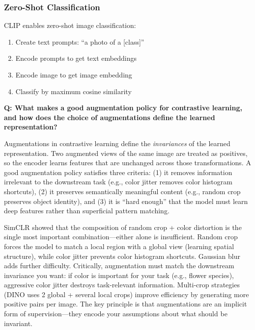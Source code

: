 \subsubsection{Zero-Shot Classification}

CLIP enables zero-shot image classification:
\begin{enumerate}
    \item Create text prompts: ``a photo of a [class]''
    \item Encode prompts to get text embeddings
    \item Encode image to get image embedding
    \item Classify by maximum cosine similarity
\end{enumerate}

\begin{interviewq}
\textbf{Q: What makes a good augmentation policy for contrastive learning, and how does the choice of augmentations define the learned representation?}

 \quad {} \quad \badgefreq{\freqmed}

\stronganswer Augmentations in contrastive learning define the \textit{invariances} of the learned representation. Two augmented views of the same image are treated as positives, so the encoder learns features that are unchanged across those transformations. A good augmentation policy satisfies three criteria: (1) it removes information irrelevant to the downstream task (e.g., color jitter removes color histogram shortcuts), (2) it preserves semantically meaningful content (e.g., random crop preserves object identity), and (3) it is ``hard enough'' that the model must learn deep features rather than superficial pattern matching.

SimCLR showed that the composition of random crop + color distortion is the single most important combination---either alone is insufficient. Random crop forces the model to match a local region with a global view (learning spatial structure), while color jitter prevents color histogram shortcuts. Gaussian blur adds further difficulty. Critically, augmentation must match the downstream invariance you want: if color is important for your task (e.g., flower species), aggressive color jitter destroys task-relevant information. Multi-crop strategies (DINO uses 2 global + several local crops) improve efficiency by generating more positive pairs per image. The key principle is that augmentations are an implicit form of supervision---they encode your assumptions about what should be invariant.


\end{interviewq}
